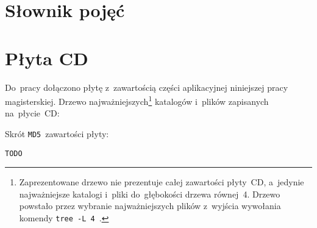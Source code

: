 \documentclass[thesis]{subfiles}
\begin{document}

\begin{appendices}


\makeatletter
{}
\makeatother



\chapter{Słownik pojęć}

\printglossary[style=labeling,title=Słownik pojęć]



\chapter{Płyta CD}
\label{ch:cd-appendix}

Do~pracy dołączono płytę z~zawartością części aplikacyjnej niniejszej pracy magisterskiej. Drzewo najważniejszych\footnote{Zaprezentowane drzewo nie prezentuje całej zawartości płyty~CD, a~jedynie najważniejsze katalogi i~pliki do~głębokości drzewa równej~4. Drzewo powstało przez wybranie najważniejszych plików z~wyjścia wywołania komendy \mbox{\texttt{tree~-L~4}}~\cite{tree-manual}.} katalogów i~plików zapisanych na~płycie~CD: %


\noindent Skrót \texttt{MD5}~zawartości płyty:
\begin{center}
\texttt{TODO}
\end{center}


\end{appendices}
\end{document}
